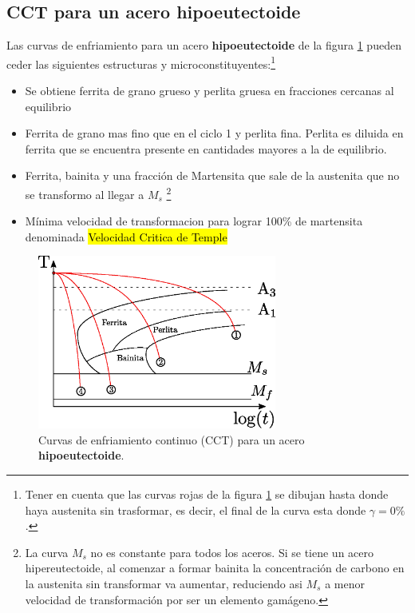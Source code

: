 \subsection{CCT para un acero hipoeutectoide}
Las curvas de enfriamiento para un acero \textbf{hipoeutectoide} de la figura \ref{fig:CCThipo} pueden ceder las siguientes estructuras y microconstituyentes:\footnote{Tener en cuenta que las curvas rojas de la figura \ref{fig:CCThipo} se dibujan hasta donde haya austenita sin trasformar, es decir, el final de la curva esta donde $\gamma=0\%$.}


\begin{itemize}
    \item[Ciclo 1] Se obtiene ferrita de grano grueso y perlita gruesa en fracciones cercanas al equilibrio
    \item[Ciclo 2] Ferrita de grano mas fino que en el ciclo 1 y perlita fina. Perlita es diluida en ferrita que se encuentra presente en cantidades mayores a la de equilibrio. 
    \item[Ciclo 3] Ferrita, bainita y una fracción de Martensita que sale de la austenita que no se transformo al llegar a $M_s$ \footnote{La curva $M_s$ no es constante para todos los aceros. Si se tiene un acero hipereutectoide, al comenzar a formar bainita la concentración de carbono en la austenita sin transformar va aumentar, reduciendo asi $M_s$ a menor velocidad de transformación por ser un elemento gamágeno.}
    \item[Ciclo 4] Mínima velocidad de transformacion para lograr 100\% de martensita denominada \hl{Velocidad Critica de Temple}
\end{itemize}

\begin{figure}[htb!]
    \centering
    \includegraphics[width=0.7\textwidth]{fig/CCThipo.eps}
    \caption{Curvas de enfriamiento continuo (CCT) para un acero \textbf{hipoeutectoide}.}
    \label{fig:CCThipo}
\end{figure}

